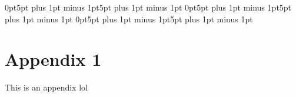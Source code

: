 \documentclass[titlesmallcaps,%
               examinerscopy,%
               copyrightpage]{uqthesis}
\begin{document}
\frontmatter
\listoftodos


\mainmatter
\setlength{\parskip}{10pt} %


\titlespacing*{\section}
{0pt}{5pt plus 1pt minus 1pt}{5pt plus 1pt minus 1pt}
\titlespacing*{\subsection}
{0pt}{5pt plus 1pt minus 1pt}{5pt plus 1pt minus 1pt}
\titlespacing*{\subsubsection}
{0pt}{5pt plus 1pt minus 1pt}{5pt plus 1pt minus 1pt}


\renewcommand*{\chapterheadendvskip}{%
  \vspace{0.725\baselineskip plus 0.115\baselineskip minus 0.192\baselineskip}%
}

\renewcommand*{\chapterheadstartvskip}{\vspace*{\baselineskip}}










 

 
 
\backmatter



\appendix
 \chapter{Appendix 1}
 
 This is an appendix lol
\end{document}
